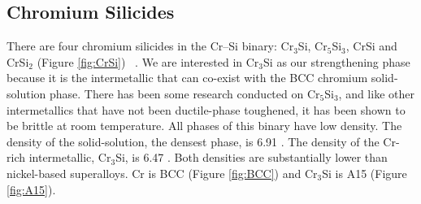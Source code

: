\subsection{Chromium Silicides}
%
There are four chromium silicides in the Cr--Si binary: Cr$_3$Si, Cr$_5$Si$_3$, CrSi and CrSi$_2$ (Figure \ref{fig:CrSi}) ~\cite{gokhale90}.  We are interested in Cr$_3$Si as our strengthening phase because it is the intermetallic that can co-exist with the BCC chromium solid-solution phase.  There has been some research conducted on Cr$_5$Si$_3$, and like other intermetallics that have not been ductile-phase toughened, it has been shown to be brittle at room temperature.  All phases of this binary have low density.  The density of the solid-solution, the densest phase, is 6.91  \gram\usk\centi\rpcubic\meter.  The density of the Cr-rich intermetallic, Cr$_3$Si, is 6.47  \gram\usk\centi\rpcubic\meter.  Both densities are substantially lower than nickel-based superalloys.  Cr is BCC (Figure \ref{fig:BCC}) and Cr$_3$Si is A15 (Figure \ref{fig:A15}).  

